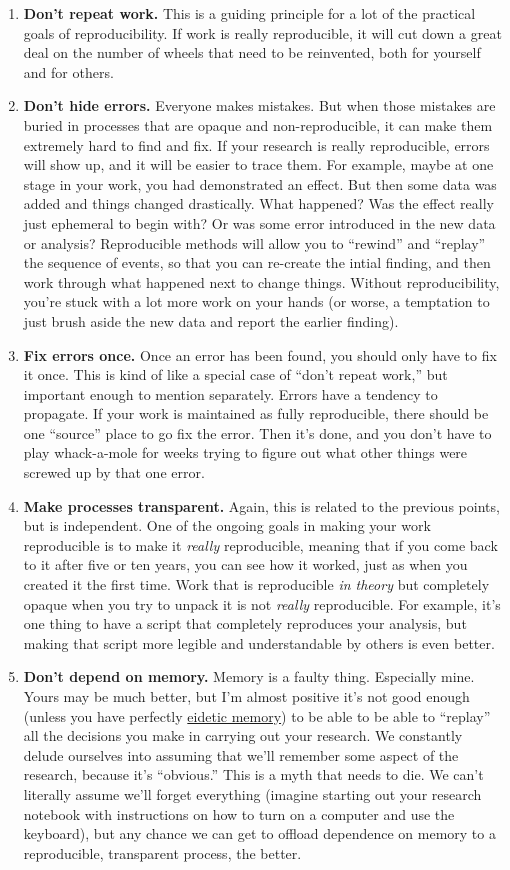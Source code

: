 \documentclass{book}
\begin{document}
\begin{enumerate}
\item \textbf{Don't repeat work.} This is a guiding principle for a lot of the practical goals of reproducibility. If work is really reproducible, it will cut down a great deal on the number of wheels that need to be reinvented, both for yourself and for others.
\item \textbf{Don't hide errors.} Everyone makes mistakes. But when those mistakes are buried in processes that are opaque and non-reproducible, it can make them extremely hard to find and fix.  If your research is really reproducible, errors will show up, and it will be easier to trace them.  For example, maybe at one stage in your work, you had demonstrated an effect. But then some data was added and things changed drastically. What happened? Was the effect really just ephemeral to begin with? Or was some error introduced in the new data or analysis?  Reproducible methods will allow you to ``rewind'' and ``replay'' the sequence of events, so that you can re-create the intial finding, and then work through what happened next to change things. Without reproducibility, you're stuck with a lot more work on your hands (or worse, a temptation to just brush aside the new data and report the earlier finding).
\item \textbf{Fix errors once.} Once an error has been found, you should only have to fix it once.  This is kind of like a special case of ``don't repeat work,'' but important enough to mention separately. Errors have a tendency to propagate. If your work is maintained as fully reproducible, there should be one ``source'' place to go fix the error.  Then it's done, and you don't have to play whack-a-mole for weeks trying to figure out what other things were screwed up by that one error.
\item \textbf{Make processes transparent.} Again, this is related to the previous points, but is independent.  One of the ongoing goals in making your work reproducible is to make it \emph{really} reproducible, meaning that if you come back to it after five or ten years, you can see how it worked, just as when you created it the first time.  Work that is reproducible \emph{in theory} but completely opaque when you try to unpack it is not \emph{really} reproducible. For example, it's one thing to have a script that completely reproduces your analysis, but making that script more legible and understandable by others is even better.
\item \textbf{Don't depend on memory.} Memory is a faulty thing. Especially mine. Yours may be much better, but I'm almost positive it's not good enough (unless you have perfectly \href{http://en.wikipedia.org/wiki/Eidetic_memory}{eidetic memory}) to be able to be able to ``replay'' all the decisions you make in carrying out your research. We constantly delude ourselves into assuming that we'll remember some aspect of the research, because it's ``obvious.''  This is a myth that needs to die. We can't literally assume we'll forget everything (imagine starting out your research notebook with instructions on how to turn on a computer and use the keyboard), but any chance we can get to offload dependence on memory to a reproducible, transparent process, the better.

\end{enumerate}
\end{document}
